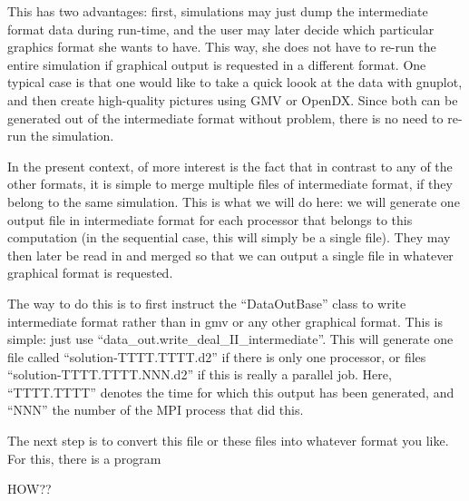 \documentclass{article}
\begin{document}
This has two advantages: first, simulations may just dump the intermediate
format data during run-time, and the user may later decide which particular
graphics format she wants to have. This way, she does not have to re-run the
entire simulation if graphical output is requested in a different format. One
typical case is that one would like to take a quick loook at the data with
gnuplot, and then create high-quality pictures using GMV or OpenDX. Since both
can be generated out of the intermediate format without problem, there is no
need to re-run the simulation.

In the present context, of more interest is the fact that in contrast to any
of the other formats, it is simple to merge multiple files of intermediate
format, if they belong to the same simulation. This is what we will do here:
we will generate one output file in intermediate format for each processor
that belongs to this computation (in the sequential case, this will simply be
a single file). They may then later be read in and merged so that we can
output a single file in whatever graphical format is requested.

The way to do this is to first instruct the ``DataOutBase'' class to
write intermediate format rather than in gmv or any other graphical
format. This is simple: just use
``data\_out.write\_deal\_II\_intermediate''. This will generate one file
called ``solution-TTTT.TTTT.d2'' if there is only one processor, or
files ``solution-TTTT.TTTT.NNN.d2'' if this is really a parallel
job. Here, ``TTTT.TTTT'' denotes the time for which this output has
been generated, and ``NNN'' the number of the MPI process that did this.

The next step is to convert this file or these files into whatever
format you like. For this, there is a program

HOW??
\end{document}
